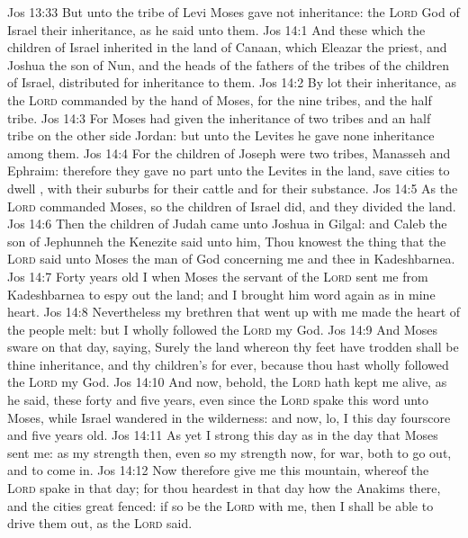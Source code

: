 \vs Jos 13:33 But unto the tribe of Levi Moses gave not  inheritance: the \textsc{Lord} God of Israel  their inheritance, as he said unto them.
\vs Jos 14:1 And these  which the children of Israel inherited in the land of Canaan, which Eleazar the priest, and Joshua the son of Nun, and the heads of the fathers of the tribes of the children of Israel, distributed for inheritance to them.
\vs Jos 14:2 By lot  their inheritance, as the \textsc{Lord} commanded by the hand of Moses, for the nine tribes, and  the half tribe.
\vs Jos 14:3 For Moses had given the inheritance of two tribes and an half tribe on the other side Jordan: but unto the Levites he gave none inheritance among them.
\vs Jos 14:4 For the children of Joseph were two tribes, Manasseh and Ephraim: therefore they gave no part unto the Levites in the land, save cities to dwell , with their suburbs for their cattle and for their substance.
\vs Jos 14:5 As the \textsc{Lord} commanded Moses, so the children of Israel did, and they divided the land.
\vs Jos 14:6 Then the children of Judah came unto Joshua in Gilgal: and Caleb the son of Jephunneh the Kenezite said unto him, Thou knowest the thing that the \textsc{Lord} said unto Moses the man of God concerning me and thee in Kadeshbarnea.
\vs Jos 14:7 Forty years old  I when Moses the servant of the \textsc{Lord} sent me from Kadeshbarnea to espy out the land; and I brought him word again as  in mine heart.
\vs Jos 14:8 Nevertheless my brethren that went up with me made the heart of the people melt: but I wholly followed the \textsc{Lord} my God.
\vs Jos 14:9 And Moses sware on that day, saying, Surely the land whereon thy feet have trodden shall be thine inheritance, and thy children's for ever, because thou hast wholly followed the \textsc{Lord} my God.
\vs Jos 14:10 And now, behold, the \textsc{Lord} hath kept me alive, as he said, these forty and five years, even since the \textsc{Lord} spake this word unto Moses, while  Israel wandered in the wilderness: and now, lo, I  this day fourscore and five years old.
\vs Jos 14:11 As yet I  strong this day as  in the day that Moses sent me: as my strength  then, even so  my strength now, for war, both to go out, and to come in.
\vs Jos 14:12 Now therefore give me this mountain, whereof the \textsc{Lord} spake in that day; for thou heardest in that day how the Anakims  there, and  the cities  great  fenced: if so be the \textsc{Lord}  with me, then I shall be able to drive them out, as the \textsc{Lord} said.
